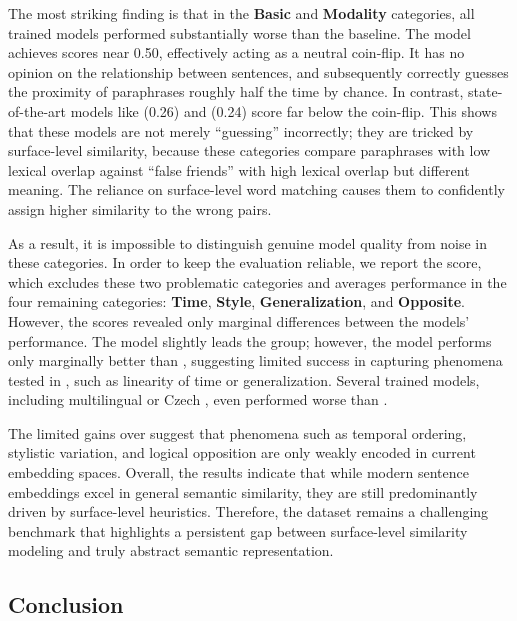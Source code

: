 The most striking finding is that in the \textbf{Basic} and \textbf{Modality} categories, all trained models performed substantially worse than the \random baseline. The \random model achieves scores near 0.50, effectively acting as a neutral coin-flip. It has no opinion on the relationship between sentences, and subsequently correctly guesses the proximity of paraphrases roughly half the time by chance. In contrast, state-of-the-art models like \tetrilarge (0.26) and \mepet (0.24) score far below the coin-flip. This shows that these models are not merely ``guessing'' incorrectly; they are tricked by surface-level similarity, because these categories compare paraphrases with low lexical overlap against ``false friends'' with high lexical overlap but different meaning. The reliance on surface-level word matching causes them to confidently assign higher similarity to the wrong pairs.

As a result, it is impossible to distinguish genuine model quality from noise in these categories. In order to keep the evaluation reliable, we report the \costraminus score,  which excludes these two problematic categories and averages performance in the four remaining categories: \textbf{Time}, \textbf{Style}, \textbf{Generalization}, and \textbf{Opposite}. However, the \costraminus scores revealed only marginal differences between the models' performance. The \Small \simcse model slightly leads the group; however, the model performs only marginally better than \randombert, suggesting limited success in capturing phenomena tested in \costra, such as linearity of time or generalization. Several trained models, including \LargeSize multilingual \xlmr or \Base Czech \fernet, even performed worse than \randombert. 

The limited gains over \randombert suggest that phenomena such as temporal ordering, stylistic variation, and logical opposition are only weakly encoded in current embedding spaces. Overall, the results indicate that while modern sentence embeddings excel in general semantic similarity, they are still predominantly driven by surface-level heuristics. Therefore, the \costra dataset remains a challenging benchmark that highlights a persistent gap between surface-level similarity modeling and truly abstract semantic representation.

\subsection{Conclusion}
\label{conclusion-costra}


